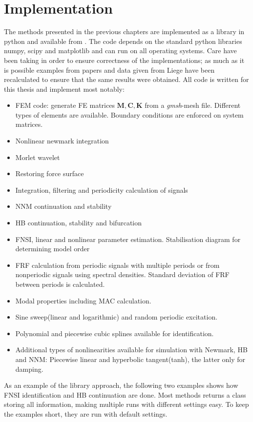 
\chapter{Implementation}
\label{cha:implementation}


The methods presented in the previous chapters are implemented as a library in
python and available from \autocite{paw2017}. The code depends on the standard
python libraries numpy, scipy and matplotlib and can run on all operating
systems. Care have been taking in order to ensure correctness of the
implementations; as much as it is possible examples from papers and data given
from Liege have been recalculated to ensure that the same results were obtained.
All code is written for this thesis and implement most notably:
\begin{itemize}
\item FEM code: generate FE matrices $\bm M, \bm C, \bm K$ from a
  \textit{gmsh}-mesh file. Different types of elements are available. Boundary
  conditions are enforced on system matrices.
\item Nonlinear newmark integration
\item Morlet wavelet
\item Restoring force surface
\item Integration, filtering and periodicity calculation of signals
\item NNM continuation and stability
\item HB continuation, stability and bifurcation
\item FNSI, linear and nonlinear parameter estimation. Stabilisation diagram
  for determining model order
\item FRF calculation from periodic signals with multiple periods or from
  nonperiodic signals using spectral densities. Standard deviation of FRF
  between periods is calculated.
\item Modal properties including MAC calculation.
\item Sine sweep(linear and logarithmic) and random periodic excitation.
\item Polynomial and piecewise cubic splines available for identification.
\item Additional types of nonlinearities available for simulation with Newmark,
  HB and NNM: Piecewise linear and hyperbolic tangent(tanh), the latter only for
  damping.
\end{itemize}

As an example of the library approach, the following two examples shows how FNSI
identification and HB continuation are done. Most methods returns a class
storing all information, making multiple runs with different settings easy. To
keep the examples short, they are run with default settings.


